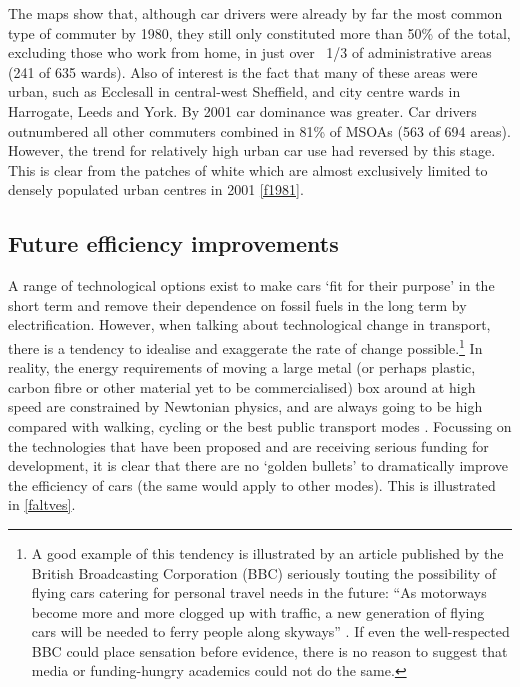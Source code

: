 The maps show that, although car drivers were already by far the most common
type of commuter by 1980, they still only constituted more than 50\% of the
total, excluding those who work from home, in just over ~1/3 of administrative
areas (241 of 635 wards). Also of interest is the fact that many of these areas
were urban, such as Ecclesall in central-west Sheffield, and city centre wards
in Harrogate, Leeds and York. By 2001 car dominance was greater. Car drivers
outnumbered all other commuters combined in 81\% of MSOAs (563 of 694 areas).
However, the trend for relatively high urban car use had reversed by this stage.
This is clear from the patches of white which are almost exclusively limited to
densely populated urban centres in 2001 \cref{f1981}.


\subsection{Future efficiency improvements}
A range of technological options exist to make cars `fit for their purpose'
in the short term \citep{plowden2008cars} and remove their dependence on
fossil fuels in the long term by electrification. However, when talking
about technological change in transport, there is a tendency to
idealise and exaggerate the rate of change possible.\footnote{A
good example of this tendency is illustrated by an article published
by the British Broadcasting Corporation (BBC) seriously
touting the possibility of flying cars catering for personal travel needs in
the future: ``As motorways become more and more clogged up with traffic,
a new generation of flying cars will be needed to ferry people along skyways''
\citep{BBCNews}.
If even the well-respected BBC could place sensation before evidence,
there is no reason to suggest that media or funding-hungry academics
could not do the same.}
In reality, the energy requirements of moving a large metal (or perhaps
plastic, carbon fibre or other material yet to be commercialised)
box around at high speed are constrained by Newtonian
physics, and are always going to be high compared with walking, cycling or
the best public transport modes \citep{MacKay2009}.
Focussing on the technologies that have been proposed and are receiving
serious funding for development, it is clear that there are no `golden
bullets' to dramatically improve the efficiency of cars
(the same would apply to other modes). This is illustrated in \cref{faltves}.

